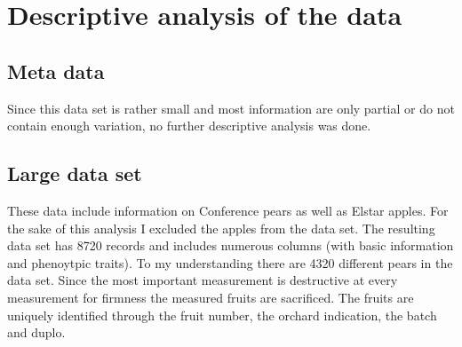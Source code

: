 \documentclass[12pt, a4paper]{article}
\begin{document}
\section*{Descriptive analysis of the data}

\subsection*{Meta data}
Since this data set is rather small and most information are only partial or do not contain enough variation, no 
further descriptive analysis was done.

\subsection*{Large data set}
These data include information on Conference pears as well as Elstar apples. For the sake of this analysis I excluded 
the apples from the data set. \newline
The resulting data set has 8720 records and includes numerous columns (with basic information and phenoytpic 
traits). To my understanding there are 4320 different pears in the data set. Since the most important measurement is 
destructive at every measurement for firmness the measured fruits are sacrificed. The fruits are uniquely 
identified through the fruit number, the orchard indication, the batch and duplo.  
\end{document}
